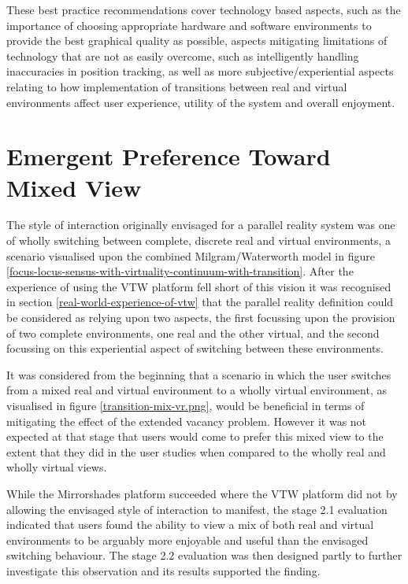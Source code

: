 These best practice recommendations cover technology based aspects, such as the importance of choosing appropriate hardware and software environments to provide the best graphical quality as possible, aspects mitigating limitations of technology that are not as easily overcome, such as intelligently handling inaccuracies in position tracking, as well as more subjective/experiential aspects relating to how implementation of transitions between real and virtual environments affect user experience, utility of the system and overall enjoyment.


\section{Emergent Preference Toward Mixed View}

The style of interaction originally envisaged for a parallel reality system was one of wholly switching between complete, discrete real and virtual environments, a scenario visualised upon the combined Milgram/Waterworth model in figure \ref{focus-locus-sensus-with-virtuality-continuum-with-transition}. After the experience of using the VTW platform fell short of this vision it was recognised in section \ref{real-world-experience-of-vtw} that the parallel reality definition could be considered as relying upon two aspects, the first focussing upon the provision of two complete environments, one real and the other virtual, and the second focussing on this experiential aspect of switching between these environments.

It was considered from the beginning that a scenario in which the user switches from a mixed real and virtual environment to a wholly virtual environment, as visualised in figure \ref{transition-mix-vr.png}, would be beneficial in terms of mitigating the effect of the extended vacancy problem. However it was not expected at that stage that users would come to prefer this mixed view to the extent that they did in the user studies when compared to the wholly real and wholly virtual views.

While the Mirrorshades platform succeeded where the VTW platform did not by allowing the envisaged style of interaction to manifest, the stage 2.1 evaluation indicated that users found the ability to view a mix of both real and virtual environments to be arguably more enjoyable and useful than the envisaged switching behaviour. The stage 2.2 evaluation was then designed partly to further investigate this observation and its results supported the finding.

